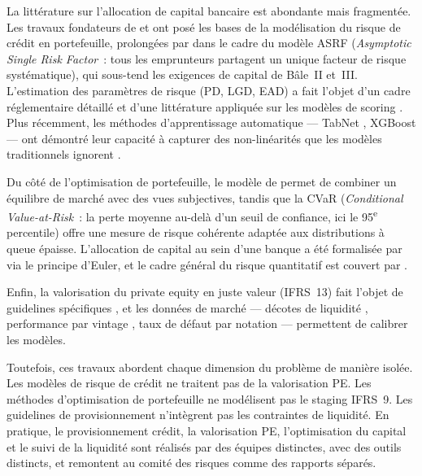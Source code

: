 \documentclass[10pt, a4paper, oneside]{report}
\theoremstyle{definition}
\begin{document}
La littérature sur l'allocation de capital bancaire est abondante mais fragmentée.
Les travaux fondateurs de \citet{merton1974} et \citet{vasicek2002} ont posé les bases de la modélisation du risque de crédit en portefeuille, prolongées par \citet{gordy2003} dans le cadre du modèle ASRF (\emph{Asymptotic Single Risk Factor}~: tous les emprunteurs partagent un unique facteur de risque systématique), qui sous-tend les exigences de capital de Bâle~II et~III.
L'estimation des paramètres de risque (PD, LGD, EAD) a fait l'objet d'un cadre réglementaire détaillé \citep{eba_gl_2017_06, eba_gl_2019_03} et d'une littérature appliquée sur les modèles de scoring \citep{siddiqi2006, hosmer_lemeshow2013}.
Plus récemment, les méthodes d'apprentissage automatique --- TabNet \citep{arik_pfister2021}, XGBoost \citep{chen_guestrin2016} --- ont démontré leur capacité à capturer des non-linéarités que les modèles traditionnels ignorent \citep{grinsztajn2022}.

Du côté de l'optimisation de portefeuille, le modèle de \citet{black_litterman1992} permet de combiner un équilibre de marché avec des vues subjectives, tandis que la CVaR (\emph{Conditional Value-at-Risk}~: la perte moyenne au-delà d'un seuil de confiance, ici le 95\textsuperscript{e} percentile) \citep{rockafellar_uryasev2000} offre une mesure de risque cohérente adaptée aux distributions à queue épaisse.
L'allocation de capital au sein d'une banque a été formalisée par \citet{tasche2008} via le principe d'Euler, et le cadre général du risque quantitatif est couvert par \citet{mcneil_frey_embrechts2015}.

Enfin, la valorisation du private equity en juste valeur (IFRS~13) fait l'objet de guidelines spécifiques \citep{ipev2022}, et les données de marché --- décotes de liquidité \citep{jefferies_lazard2023}, performance par vintage \citep{cambridge2023}, taux de défaut par notation \citep{moodys_default2023} --- permettent de calibrer les modèles.


Toutefois, ces travaux abordent chaque dimension du problème de manière isolée.
Les modèles de risque de crédit ne traitent pas de la valorisation PE.
Les méthodes d'optimisation de portefeuille ne modélisent pas le staging IFRS~9.
Les guidelines de provisionnement n'intègrent pas les contraintes de liquidité.
En pratique, le provisionnement crédit, la valorisation PE, l'optimisation du capital et le suivi de la liquidité sont réalisés par des équipes distinctes, avec des outils distincts, et remontent au comité des risques comme des rapports séparés.
\end{document}
